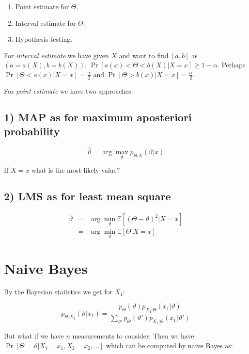 \begin{enumerate}
	\item Point estimate for $\Theta$.
	\item Interval estimate for $\Theta$.
	\item Hypothesis testing.
\end{enumerate}

For \textit{interval estimate} we have given $X$ and want to find $[a,b]$ as $(a = a(X), b = b(X))$. $\Pr[a(x) < \Theta < b(X) \vert X = x] \geq 1 - \alpha$. Perhaps $\Pr[\Theta < a(x) \vert X =x ] = \frac{\alpha}{2}$ and $\Pr[\Theta > b(x) \vert X =x ] = \frac{\alpha}{2}$.

For \textit{point estimate} we have two approaches.

\subsection{1) MAP as for maximum aposteriori probability}

$$
\hat{\vartheta} = \arg\max_{\vartheta} p_{\Theta \vert X} (\vartheta \vert x)
$$

If $X = x$ what is the most likely value?

\subsection{2) LMS as for least mean square}

$$
\begin{array}{rcl}
\hat{\vartheta} & = & \arg\min_{\vartheta} \mathbb{E}[(\Theta - \vartheta)^{2} \vert X = x] \\
& = & \arg\min_{\vartheta} \mathbb{E}[\Theta \vert X = x]
\end{array}
$$

\section{Naive Bayes}

By the Bayesian statistics we get for $X_{1}$:

$$
p_{\Theta\vert X_{1}} (\vartheta \vert x_{1}) = \frac{p_{\Theta}(\vartheta) p_{X_{1} \vert\Theta}(x_{1} \vert \vartheta)}{\sum_{\vartheta'} p_{\Theta}(\vartheta')p_{X_{1}\vert\Theta}(x_{1} \vert \vartheta')}
$$

But what if we have $n$ measurements to consider. Then we have $\Pr[\Theta = \vartheta \vert X_{1} = x_{1}, X_{2} = x_{2}, \dots]$ which can be computed by naive Bayes as:

